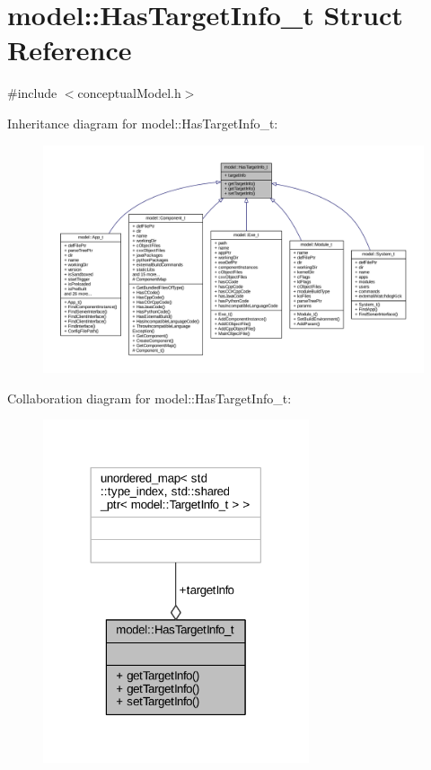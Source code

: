 \hypertarget{structmodel_1_1_has_target_info__t}{}\section{model\+:\+:Has\+Target\+Info\+\_\+t Struct Reference}
\label{structmodel_1_1_has_target_info__t}


{\ttfamily \#include $<$conceptual\+Model.\+h$>$}



Inheritance diagram for model\+:\+:Has\+Target\+Info\+\_\+t\+:
\nopagebreak
\begin{figure}[H]
\begin{center}
\leavevmode
\includegraphics[width=350pt]{structmodel_1_1_has_target_info__t__inherit__graph}
\end{center}
\end{figure}


Collaboration diagram for model\+:\+:Has\+Target\+Info\+\_\+t\+:
\nopagebreak
\begin{figure}[H]
\begin{center}
\leavevmode
\includegraphics[width=222pt]{structmodel_1_1_has_target_info__t__coll__graph}
\end{center}
\end{figure}
